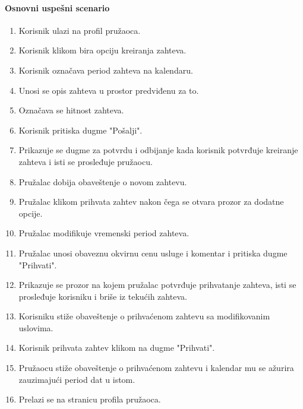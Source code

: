 \documentclass[a4paper,12pt]{report}
\begin{document}
			\paragraph*{Osnovni uspešni scenario}
				\begin{enumerate}
					\item Korisnik ulazi na profil pružaoca.
					\item Korisnik klikom bira opciju kreiranja zahteva.
					\item Korisnik označava period zahteva na kalendaru.
					\item Unosi se opis zahteva u prostor predviđenu za to.
					\item Označava se hitnost zahteva.
					\item Korisnik pritiska dugme "Pošalji".
					\item Prikazuje se dugme za potvrdu i odbijanje kada korisnik potvrđuje kreiranje zahteva i isti se prosleđuje pružaocu.
					\item Pružalac dobija obaveštenje o novom zahtevu.
					\item Pružalac klikom prihvata zahtev nakon čega se otvara prozor za dodatne opcije.
					\item Pružalac modifikuje vremenski period zahteva.
					\item Pružalac unosi obaveznu okvirnu cenu usluge i komentar i pritiska dugme "Prihvati".
					\item Prikazuje se prozor na kojem pružalac potvrđuje prihvatanje zahteva, isti se prosleđuje korisniku i briše iz tekućih zahteva.
					\item Korisniku stiže obaveštenje o prihvaćenom zahtevu sa modifikovanim uslovima.
					\item Korisnik prihvata zahtev klikom na dugme "Prihvati".
					\item Pružaocu stiže obaveštenje o prihvaćenom zahtevu i kalendar mu se ažurira zauzimajući period dat u istom.
					\item Prelazi se na stranicu profila pružaoca.
				\end{enumerate}
\end{document}
